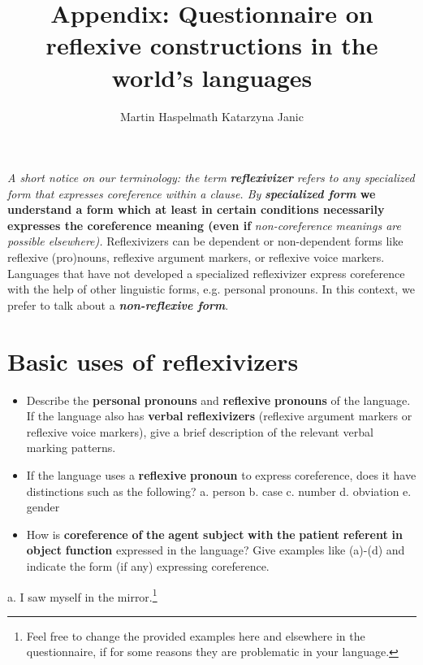 \documentclass[output=paper]{langsci/langscibook} \label{AppendixA}
\title{Appendix: Questionnaire on reflexive constructions in the world's languages} \label{Appendix}
\author{Martin Haspelmath \lastand Katarzyna Janic}
\begin{document}
\maketitle




\textit{A short notice on our terminology: the term} \textbf{\textit{reflexivizer} }\textit{refers to any specialized form that expresses coreference within a clause. By} \textbf{\textit{specialized form} we understand a form which at least in certain conditions necessarily expresses the coreference meaning (even if} {\textit{non-coreference meanings are possible elsewhere).} Reflexivizers can be dependent or non-dependent forms like reflexive (pro)nouns, reflexive argument markers, or reflexive voice markers. Languages that have not developed a specialized reflexivizer express coreference with the help of other linguistic forms, e.g. personal pronouns. In this context, we prefer to talk about a} \textbf{\textit{non-reflexive form}}.


\section{Basic uses of reflexivizers} 

\begin{itemize}
\item 
Describe the \textbf{personal} \textbf{pronouns} and \textbf{reflexive} \textbf{pronouns} of the language. If the language also has \textbf{verbal} \textbf{reflexivizers} (reflexive argument markers or reflexive voice markers), give a brief description of the relevant verbal marking patterns. 
\item 
If the language uses a \textbf{reflexive} \textbf{pronoun} to express coreference, does it have distinctions such as the following?
a. person    b. case    c. number   d. obviation    e. gender 

\item 
How is \textbf{coreference} \textbf{of} \textbf{the} \textbf{agent} \textbf{subject} \textbf{with} \textbf{the} \textbf{patient} \textbf{referent} \textbf{in} \textbf{object} \textbf{function} expressed in the language? Give examples like (a)-(d) and indicate the form (if any) expressing coreference.
\end{itemize}

a.  I saw myself in the mirror.\footnote{Feel free to change the provided examples here and elsewhere in the questionnaire, if for some reasons they are problematic in your language.}  
\end{document}
